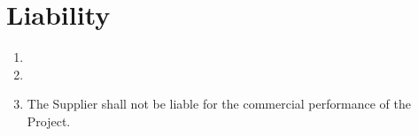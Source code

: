 \documentclass[nz-terms]{subfiles}
\begin{document}
\section{Liability}

\begin{enumerate}
\item 
\item 
\item The Supplier shall not be liable for the commercial performance of the
Project.
\end{enumerate}
\end{document}
